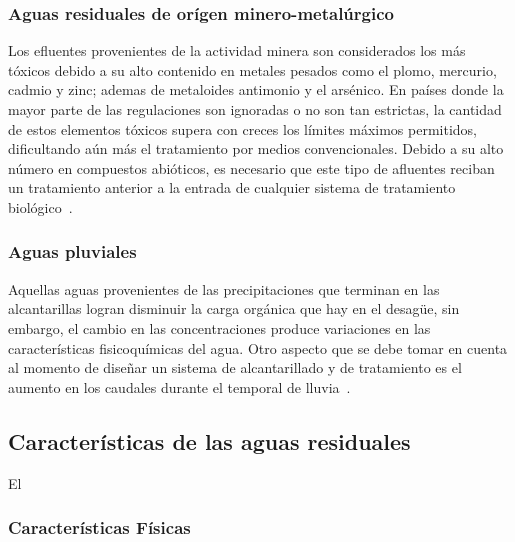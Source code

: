 \subsubsection*{Aguas residuales de orígen minero-metalúrgico}
Los efluentes provenientes de la actividad minera son considerados los más tóxicos debido a su alto contenido en metales pesados como el plomo, mercurio, cadmio y zinc; ademas de metaloides antimonio y el arsénico. En países donde la mayor parte de las regulaciones son ignoradas o no son tan estrictas, la cantidad de estos elementos tóxicos supera con creces los límites máximos permitidos, dificultando aún más el tratamiento por medios convencionales. Debido a su alto número en compuestos abióticos, es necesario que este tipo de afluentes reciban un tratamiento anterior a la entrada de cualquier sistema de tratamiento biológico~\citep{lazcano2016}.
\subsubsection*{Aguas pluviales}
Aquellas aguas provenientes de las precipitaciones que terminan en las alcantarillas logran disminuir la carga orgánica que hay en el desagüe, sin embargo, el cambio en las concentraciones produce variaciones en las características fisicoquímicas del agua. Otro aspecto que se debe tomar en cuenta al momento de diseñar un sistema de alcantarillado y de tratamiento es el aumento en los caudales durante el temporal de lluvia~\citep{lazcano2016}.
\subsection{Características de las aguas residuales}
El 
\subsubsection{Características Físicas}
